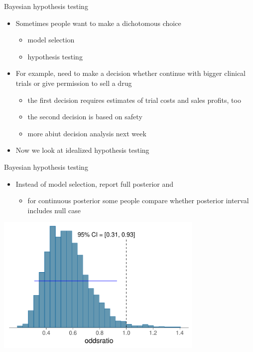 \documentclass[english,t]{beamer}
\begin{document}
\begin{frame}{Bayesian hypothesis testing}

  \begin{itemize}
  \item Sometimes people want to make a dichotomous choice
    \begin{itemize}
    \item model selection
    \item hypothesis testing
    \end{itemize}
  \item<2-> For example, need to make a decision whether continue with
    bigger clinical trials or give permission to sell a drug
    \begin{itemize}
    \item the first decision requires estimates of trial costs and
      sales profits, too
    \item the second decision is based on safety
    \item more abiut decision analysis next week
    \end{itemize}
  \item<3-> Now we look at idealized hypothesis testing
  \end{itemize}

\end{frame}

\begin{frame}{Bayesian hypothesis testing}

  \begin{itemize}
  \item Instead of model selection, report full posterior {and}
    \begin{itemize}
      \item for continuous posterior some people compare whether
        posterior interval includes null case
    \end{itemize}
  \end{itemize}
  
  {\includegraphics[width=10cm]{odds1_ci.pdf}}
  
\end{frame}
\end{document}
